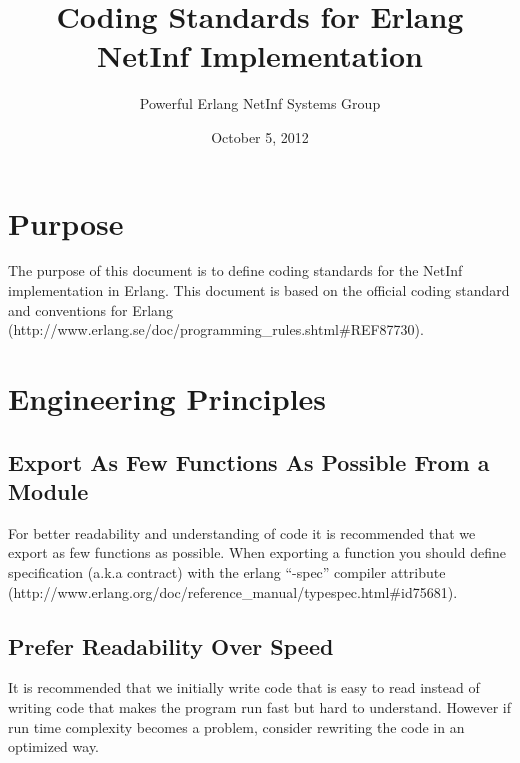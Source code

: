 \documentclass[12pt]{article}
\title{Coding Standards for Erlang NetInf Implementation}			%
\author{Powerful Erlang NetInf Systems Group }		%
\date{October 5, 2012}					%
\begin{document}
\maketitle					%



\section{Purpose}
The purpose of this document is to define coding standards for the NetInf implementation in Erlang. 
This document is based on the official coding standard and conventions for Erlang (http://www.erlang.se/doc/programming\_rules.shtml\#REF87730). 

\section{Engineering Principles}
\subsection{Export As Few Functions As Possible From a Module}
For better readability and understanding of code it is recommended that we export as few functions as possible.
When exporting a function you should define specification (a.k.a contract) with the erlang “-spec” compiler attribute (http://www.erlang.org/doc/reference\_manual/typespec.html\#id75681). 

\subsection{Prefer Readability Over Speed}
It is recommended that we initially write code that is easy to read instead of writing code that makes the program run fast but hard to understand. However if run time complexity becomes a problem, consider rewriting the code in an optimized way. 
\end{document}
